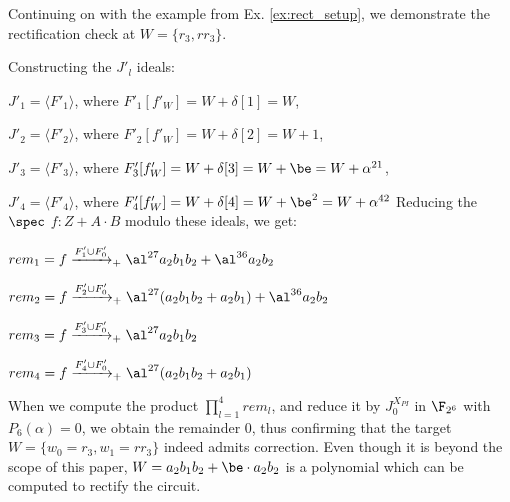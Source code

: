 \begin{Example}
\label{ex:3}
Continuing on with the example from Ex. \ref{ex:rect_setup}, we
demonstrate the rectification check at $W=\{r_3,rr_3\}$. 

Constructing the $J'_l$ ideals:
\bi
\item {\small$J'_1 = \langle F'_1\rangle$, where $F'_1[f'_W]=W+\delta[1]=W$},
\item {\small$J'_2 = \langle F'_2\rangle$, where $F'_2[f'_W]=W+\delta[2]=W+1$},
\item {\small$J'_3 = \langle F'_3\rangle$, where $F'_3[f'_W]=W+\delta[3]=W+\be=W+\alpha^{21}$},
\item {\small$J'_4 = \langle F'_4\rangle$, where $F'_4[f'_W]=W+\delta[4]=W+\be^2=W+\alpha^{42}$}
\ei
Reducing the $\spec$ $f: Z+A\cdot B$ modulo these ideals, we get:
\bi
\item $rem_1 = f \xrightarrow[]{F'_1\cup F'_{0}}_+{\al^{27} a_2b_1b_2+\al^{36} a_2b_2}$
\item $rem_2 = f \xrightarrow[]{F'_2\cup F'_{0}}_+{\al^{27} (a_2b_1b_2+a_2b_1)+\al^{36} a_2b_2}$
\item $rem_3 = f \xrightarrow[]{F'_3\cup F'_{0}}_+{\al^{27} a_2b_1b_2}$
\item $rem_4 = f \xrightarrow[]{F'_4\cup F'_{0}}_+{\al^{27} (a_2b_1b_2+a_2b_1)}$
\ei

When we compute the product $\prod_{l=1}^{4} rem_l$, 
and reduce it by $J_{0}^{X_{PI}}$ in $\F_{2^6}$ with
$P_6(\alpha)=0$, we obtain the remainder 0, thus confirming
that the target $W=\{w_0=r_3,w_1=rr_3\}$ indeed admits correction.
Even though it is beyond the scope of this paper, $W=a_2b_1b_2+\be \cdot a_2b_2$ 
is a polynomial which can be computed to rectify the circuit. 
\end{Example}
\vspace{-0.15in}
